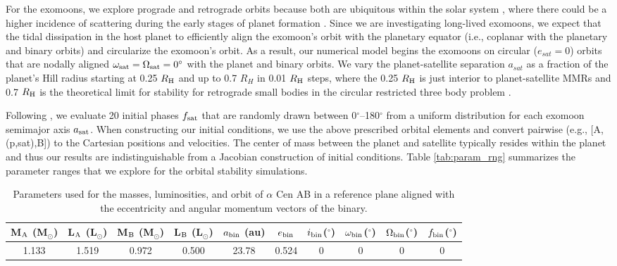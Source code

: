 \documentclass[preprint]{aastex63}
\begin{document}
For the exomoons, we explore prograde and retrograde orbits because both are ubiquitous within the solar system \citep{Jewitt2007}, where there could be a higher incidence of scattering during the early stages of planet formation \citep{Quintana2002,Quintana2007,Haghighipour2007}.  Since we are investigating long-lived exomoons, we expect that the tidal dissipation in the host planet to efficiently align the exomoon's orbit with the planetary equator (i.e., coplanar with the planetary and binary orbits) and circularize the exomoon's orbit.  As a result, our numerical model begins the exomoons on circular ($e_{sat} = 0$) orbits that are nodally aligned $\omega_{\rm sat}=\Omega_{\rm sat} = 0^\circ$ with the planet and binary orbits.  We vary the planet-satellite separation $a_{sat}$ as a fraction of the planet's Hill radius starting at 0.25 $R_{\rm H}$ and up to 0.7 $R_H$ in 0.01 $R_{\rm H}$ steps, where the 0.25 $R_{\rm H}$ is just interior to planet-satellite MMRs and 0.7 $R_{\rm H}$ is the theoretical limit for stability for retrograde small bodies in the circular restricted three body problem \citep{Quarles2020}.  

Following \cite{Rosario-Franco2020}, we evaluate 20 initial phases $f_{\rm sat}$ that are randomly drawn between 0$^\circ$--180$^\circ$ from a uniform distribution for each exomoon semimajor axis $a_{\rm sat}$.  When constructing our initial conditions, we use the above prescribed orbital elements and convert pairwise (e.g., [A,(p,sat),B]) to the Cartesian positions and velocities.  The center of mass between the planet and satellite typically resides within the planet and thus our results are indistinguishable from a Jacobian construction of initial conditions.  Table \ref{tab:param_rng} summarizes the parameter ranges that we explore for the orbital stability simulations. 


\begin{table*}
	\centering
	\caption{Parameters used for the masses, luminosities, and orbit of $\alpha$ Cen AB {{in a reference plane aligned with the eccentricity and angular momentum vectors of the binary}}.}
	\label{tab:ICs}
	\begin{tabular}{cccccccccc} %
		\hline
		 M$_{\rm A}$ (M$_\odot$) & L$_{\rm A}$ (L$_\odot$) & M$_{\rm B}$ (M$_\odot$) & L$_{\rm B}$ (L$_\odot$) & $a_{\rm bin}$ (au) & $e_{\rm bin}$ & $i_{\rm bin}$($^\circ$) & $\omega_{\rm bin}$($^\circ$) & $\Omega_{\rm bin}$($^\circ$) & $f_{\rm bin}$($^\circ$)\\
		\hline
		1.133 & 1.519 & 0.972 & 0.500 & 23.78 & 0.524 & 0 & 0 & 0 & 0\\
		\hline
	\end{tabular}
\end{table*}
\end{document}
